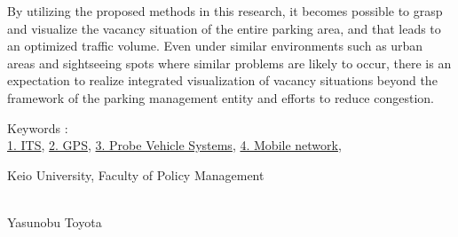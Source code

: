 By utilizing the proposed methods in this research, 
it becomes possible to grasp and visualize the vacancy situation of the entire parking area, and that leads to an optimized traffic volume. Even under similar environments such as urban areas and sightseeing spots where similar problems are likely to occur, there is an expectation to realize integrated visualization of vacancy situations beyond the framework of the parking management entity and efforts to reduce congestion.


Keywords :\\
\underline{1. ITS},
\underline{2. GPS},
\underline{3. Probe Vehicle Systems},
\underline{4. Mobile network},


\begin{flushright}
	Keio University, Faculty of Policy Management\\
	~ \\
	\begin{large}
		Yasunobu Toyota
	\end{large}
\end{flushright}

